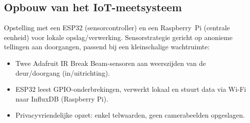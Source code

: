 \subsection{Opbouw van het IoT-meetsysteem}
Opstelling met een ESP32 (sensorcontroller) en een Raspberry~Pi (centrale eenheid) voor lokale opslag/verwerking. Sensorstrategie gericht op anonieme tellingen aan doorgangen, passend bij een kleinschalige wachtruimte:

\begin{itemize}
    \item Twee Adafruit IR Break Beam-sensoren aan weerszijden van de deur/doorgang (in/uitrichting).
    \item ESP32 leest GPIO-onderbrekingen, verwerkt lokaal en stuurt data via Wi-Fi naar InfluxDB (Raspberry Pi).
    \item Privacyvriendelijke opzet: enkel telwaarden, geen camerabeelden opgeslagen.
\end{itemize}






